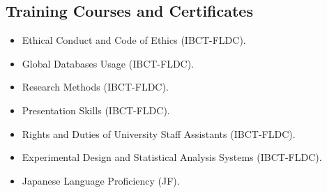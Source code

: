 \documentclass[margin,line,a4paper]{resume}
\begin{document}
\begin{resume}
%
%
%


\section{\mysidestyle Training Courses and Certificates}
\begin{itemize}

\item Ethical Conduct and Code of Ethics (IBCT-FLDC).
\item Global Databases Usage (IBCT-FLDC).
\item Research Methods (IBCT-FLDC).
\item Presentation Skills (IBCT-FLDC).
\item Rights and Duties of University Staff Assistants (IBCT-FLDC).
\item Experimental Design and Statistical Analysis Systems (IBCT-FLDC).
\item Japanese Language Proficiency (JF).

\end{itemize}





\end{resume}
\end{document}
